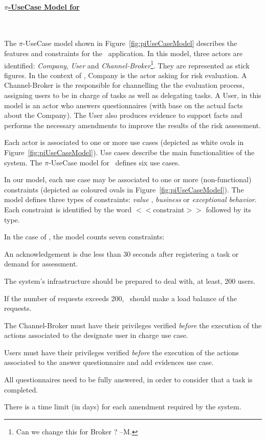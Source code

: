 \paragraph{\underline{$\pi$-UseCase Model for \FlyingPig}}~

The $\pi$-UseCase model shown in Figure~\ref{fig:piUseCaseModel} describes the features and constraints for the \FlyingPig\ application. 
In this model, three actors are identified: \textit{Company}, \textit{User} and \textit{Channel-Broker}\footnote{\color{red} Can we change this for Broker ? --M.}. 
They are represented as stick figures.
In the context of \FlyingPig, Company is the actor asking for risk evaluation.
A Channel-Broker is the responsible for channelling the the evaluation process, assigning users to be in charge of tasks as well as delegating tasks. 
A User, in this model is an actor who answers questionnaires (with base on the actual facts about the Company).
The User also produces evidence to support facts and performs the necessary amendments to improve the results of the risk assessment.

Each actor is associated to one or more use cases (depicted as white ovals in Figure~\ref{fig:piUseCaseModel}). 
Use cases describe the main functionalities of the system.
The $\pi$-UseCase model for \FlyingPig\ defines six use cases. 

In our model, each use case may be associated to one or more (non-functional) constraints (depicted as coloured ovals in Figure~\ref{fig:piUseCaseModel}). 
The model defines three types of constraints: \textit{value} , \textit{business} or \textit{exceptional behavior}. 
Each constraint is identified by the word $<<$\textsf{constraint}$>>$ followed by its type.

In the case of \FlyingPig, the model counts seven constraints:
\begin{numtrivlist}
\item An acknowledgement is due less than 30 seconds after registering a task or demand for assessment. 
\item The system's infrastructure should be prepared to deal with, at least, 200 users. 
\item If the number of requests exceeds 200, \FlyingPig\ should make a load balance of the requests. 
\item The Channel-Broker must have their privileges verified \textit{before} the execution of the actions associated to the \textsf{designate user in charge} use case.
\item Users must have their privileges verified \textit{before} the execution of the actions associated to the \textsf{answer questionnaire and add evidences} use case.
\item All questionnaires need to be fully answered, in order to consider that a task is completed.
\item There is a time limit (in days) for each amendment required by the system.
\end{numtrivlist}

